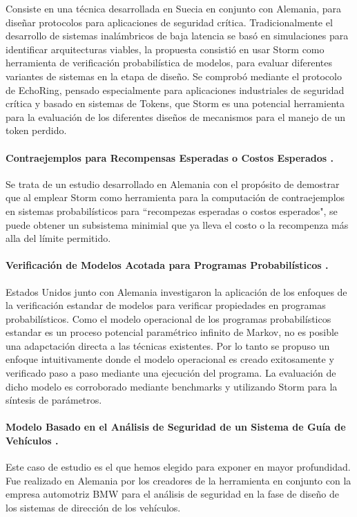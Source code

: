 \documentclass[11pt]{article}
\begin{document}
Consiste en una t\'ecnica desarrollada en Suecia en conjunto con Alemania, para dise\~nar protocolos para aplicaciones de seguridad cr\'itica. Tradicionalmente el desarrollo de sistemas inal\'ambricos de baja latencia se bas\'o en simulaciones para identificar arquitecturas viables, la propuesta consisti\'o en usar Storm como herramienta de verificaci\'on probabil\'istica de modelos, para evaluar diferentes variantes de sistemas en la etapa de dise\~no. Se comprob\'o mediante el protocolo de EchoRing, pensado especialmente para aplicaciones industriales de seguridad cr\'itica y basado en sistemas de Tokens, que Storm es una potencial herramienta para la evaluaci\'on de los diferentes dise\~nos de mecanismos para el manejo de un token perdido.

\paragraph{Contraejemplos para Recompensas Esperadas o Costos Esperados \cite{Tim}.}
Se trata de un estudio desarrollado en Alemania con el prop\'osito de demostrar que al emplear Storm como herramienta para la computaci\'on de contraejemplos en sistemas probabil\'isticos para ``recompezas esperadas o costos esperados", se puede obtener un subsistema minimial que ya lleva el costo o la recompenza m\'as alla del l\'imite permitido.

\paragraph{Verificaci\'on de Modelos Acotada para Programas Probabil\'isticos \cite{Nils}.}
Estados Unidos junto con Alemania investigaron la aplicaci\'on de los enfoques de la verificaci\'on estandar de modelos para verificar propiedades en programas probabil\'isticos. Como el modelo operacional de los programas probabil\'isticos estandar es un proceso potencial param\'etrico infinito de Markov, no es posible una adapctaci\'on directa a las t\'ecnicas existentes. Por lo tanto se propuso un enfoque intuitivamente donde el modelo operacional es creado exitosamente y verificado paso a paso mediante una ejecuci\'on del programa. La evaluaci\'on de dicho modelo es corroborado mediante benchmarks y utilizando Storm para la s\'intesis de par\'ametros.

\paragraph{Modelo Basado en el An\'alisis de Seguridad de un Sistema de Gu\'ia de Veh\'iculos \cite{Majdi}.} 
Este caso de estudio es el que hemos elegido para exponer en mayor profundidad. Fue realizado en Alemania por los creadores de la herramienta en conjunto con la empresa automotriz BMW para el an\'alisis de seguridad en la fase de dise\~no de los sistemas de direcci\'on de los veh\'iculos.
\end{document}
